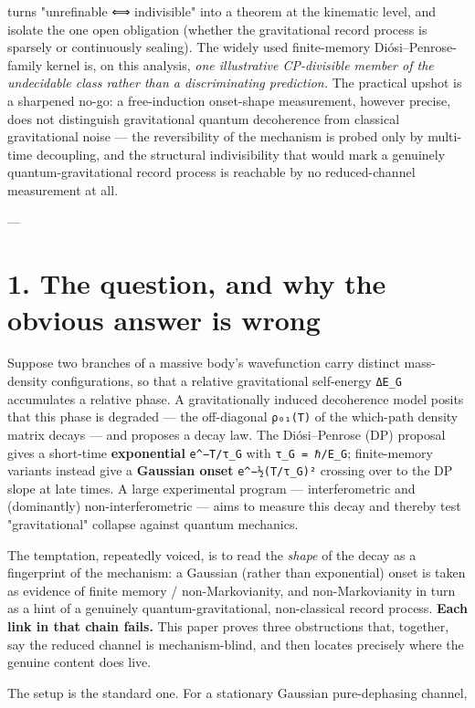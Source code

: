 \documentclass[11pt]{article}
\begin{document}
turns "unrefinable ⟺ indivisible" into a theorem at the kinematic level, and isolate the one open obligation (whether the gravitational record process is sparsely or continuously sealing). The widely used finite-memory Diósi–Penrose-family kernel is, on this analysis, \emph{one illustrative CP-divisible member of the undecidable class rather than a discriminating prediction.} The practical upshot is a sharpened no-go: a free-induction onset-shape measurement, however precise, does not distinguish gravitational quantum decoherence from classical gravitational noise — the reversibility of the mechanism is probed only by multi-time decoupling, and the structural indivisibility that would mark a genuinely quantum-gravitational record process is reachable by no reduced-channel measurement at all.

---

\section*{1. The question, and why the obvious answer is wrong}
Suppose two branches of a massive body's wavefunction carry distinct mass-density configurations, so that a relative gravitational self-energy \texttt{ΔE\_G} accumulates a relative phase. A gravitationally induced decoherence model posits that this phase is degraded — the off-diagonal \texttt{ρ₀₁(T)} of the which-path density matrix decays — and proposes a decay law. The Diósi–Penrose (DP) proposal gives a short-time \textbf{exponential} \texttt{e\textasciicircum{}{−T/τ\_G}} with \texttt{τ\_G = ℏ/E\_G}; finite-memory variants instead give a \textbf{Gaussian onset} \texttt{e\textasciicircum{}{−½(T/τ\_G)²}} crossing over to the DP slope at late times. A large experimental program — interferometric and (dominantly) non-interferometric — aims to measure this decay and thereby test "gravitational" collapse against quantum mechanics.

The temptation, repeatedly voiced, is to read the \emph{shape} of the decay as a fingerprint of the mechanism: a Gaussian (rather than exponential) onset is taken as evidence of finite memory / non-Markovianity, and non-Markovianity in turn as a hint of a genuinely quantum-gravitational, non-classical record process. \textbf{Each link in that chain fails.} This paper proves three obstructions that, together, say the reduced channel is mechanism-blind, and then locates precisely where the genuine content does live.

The setup is the standard one. For a stationary Gaussian pure-dephasing channel,
\end{document}
